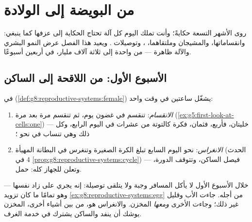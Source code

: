 \chapter{من البويضة إلى الولادة}\label{ch:g8:from-egg-to-birth}

روى  الأشهر التسعة حكايةً؛
وأنت تملك اليوم كل آلة تحتاج الحكاية إلى عزفها كما ينبغي:
 وانقساماتها، والمشيجان وملتقاهما، ،
وتوصيلات . ويعيد هذا الفصل عرض النمو البشري والآلة
ظاهرة --- من  واحدة إلى ثلاثة آلاف مليار، في أربعين
أسبوعًا.

\section{الأسبوع الأول: من اللاقحة إلى الساكن}

\begin{proposition}\label{prop:g8:from-egg-to-birth:firstweek}
 في 
(\cref{def:g8:reproductive-systems:female}) يشغّل ساعتين
في وقت واحد:
\begin{enumerate}
  \item \emph{الانقسام}: تنقسم  في غضون يوم، ثم
        تنقسم مرة بعد مرة
        (\cref{ex:g5:first-look-at-cells:one}) --- خليتان،
        فأربع، فثمان، فكرة كالتوتة من عشرات  في
        اليوم الرابع، وكل ذلك وهي تنساب في 
        نحو ؛
  \item \emph{الانغراس}: نحو اليوم السابع تبلغ الكرة
        الصغيرة  وتنغرس في البطانة المهيأة (الحدث 4
        في \cref{prop:g8:reproductive-systems:cycle}) ---
        فيصل الساكن، وتتوقف الدورة، وتعلن 
        للجهاز كله: حمل.
\end{enumerate}
\end{proposition}
\admitted

\begin{example}\label{ex:g8:from-egg-to-birth:provisions}
خلال الأسبوع الأول لا يأكل المسافر وجبة ولا يتلقى
توصيلة: إنه يجري على زاد  نفسها --- وهو تمامًا ما
كان تزويد \cref{ex:g8:reproductive-systems:egg} من أجله.
جاءت   الأب وقليل غير ذلك؛ وجاءت 
 الأخرى \emph{ومعها} المخزن. والانغراس هو، من بين
أشياء أخرى، المخزن يوشك أن ينفد والساكن يشترك في خدمة
الغرف.
\end{example}


